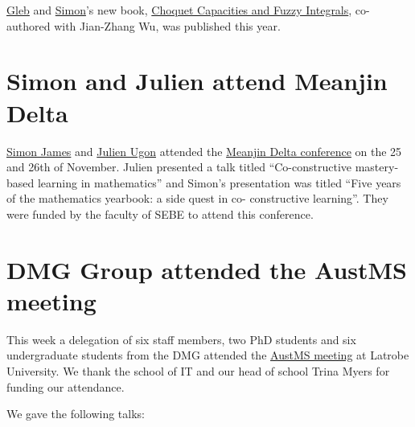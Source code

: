 \documentclass[10pt,twoside,a5paper]{scrreprt}
\begin{document}
  \href{https://d-m-g.org/author/gleb-beliakov}{Gleb} and
  \href{https://d-m-g.org/author/simon-james}{Simon}'s new book,
  \href{https://doi.org/10.1007/978-3-031-97070-2}{Choquet Capacities
  and Fuzzy Integrals}, co-authored with Jian-Zhang Wu, was published this year. 

  \section*{Simon and Julien attend Meanjin Delta}

  \href{https://d-m-g.org/author/simon-james}{Simon James} and
  \href{https://d-m-g.org/author/julien-ugon}{Julien Ugon} attended the
  \href{https://fyimaths.weebly.com/meanjin-delta-2025.html}{Meanjin
  Delta conference} on the 25 and 26th of November. Julien presented a
  talk titled ``Co-constructive mastery-based learning in mathematics''
  and Simon's presentation was titled ``Five years of the mathematics
  yearbook: a side quest in co- constructive learning''. 
They were funded by the faculty of SEBE  to attend this
  conference.

  \section*{DMG Group attended the AustMS meeting}

  This week a delegation of six staff members, two PhD students and six
  undergraduate students from the DMG attended the
  \href{https://www.austms2025.org.au}{AustMS meeting} at Latrobe
  University. We thank the school of IT and our head of school Trina Myers for funding our attendance.

  We gave the following talks:
\end{document}
